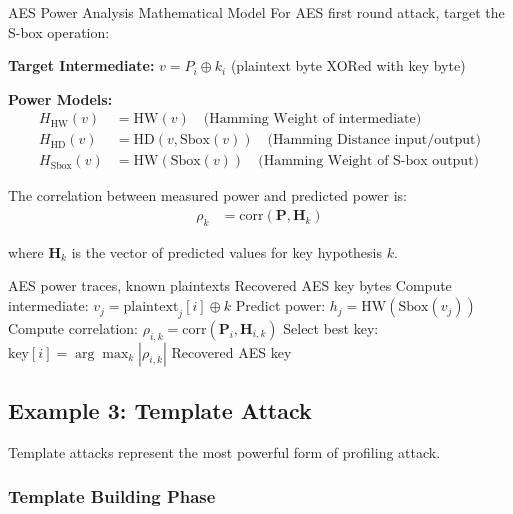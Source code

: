 \documentclass[11pt,a4paper]{article}
\theoremstyle{definition}
\begin{document}
\begin{mathematicsbox}{AES Power Analysis Mathematical Model}
For AES first round attack, target the S-box operation:

\textbf{Target Intermediate:} $v = P_i \oplus k_i$ (plaintext byte XORed with key byte)

\textbf{Power Models:}
\begin{align}
H_{\text{HW}}(v) &= \text{HW}(v) \quad \text{(Hamming Weight of intermediate)} \\
H_{\text{HD}}(v) &= \text{HD}(v, \text{Sbox}(v)) \quad \text{(Hamming Distance input/output)} \\
H_{\text{Sbox}}(v) &= \text{HW}(\text{Sbox}(v)) \quad \text{(Hamming Weight of S-box output)}
\end{align}

The correlation between measured power and predicted power is:
\begin{align}
\rho_k &= \text{corr}(\mathbf{P}, \mathbf{H}_k)
\end{align}

where $\mathbf{H}_k$ is the vector of predicted values for key hypothesis $k$.
\end{mathematicsbox}

\begin{algorithm}
\caption{AES Correlation Power Analysis}
\begin{algorithmic}[1]
\REQUIRE AES power traces, known plaintexts
\ENSURE Recovered AES key bytes
            \STATE Compute intermediate: $v_j = \text{plaintext}_j[i] \oplus k$
            \STATE Predict power: $h_j = \text{HW}(\text{Sbox}(v_j))$
        \ENDFOR
        \STATE Compute correlation: $\rho_{i,k} = \text{corr}(\mathbf{P}_i, \mathbf{H}_{i,k})$
    \ENDFOR
    \STATE Select best key: $\text{key}[i] = \arg\max_k |\rho_{i,k}|$
\ENDFOR
\RETURN Recovered AES key
\end{algorithmic}
\end{algorithm}

\subsection{Example 3: Template Attack}

Template attacks represent the most powerful form of profiling attack.

\subsubsection{Template Building Phase}
\end{document}
